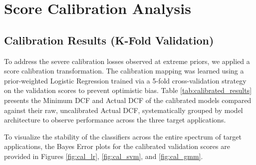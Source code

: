 \chapter{Score Calibration Analysis}
\label{chap:score_calibration}
\section{Calibration Results (K-Fold Validation)}
To address the severe calibration losses observed at extreme priors, we applied a score calibration transformation. The calibration mapping was learned using a prior-weighted Logistic Regression trained via a 5-fold cross-validation strategy on the validation scores to prevent optimistic bias.
Table \ref{tab:calibrated_results} presents the Minimum DCF and Actual DCF of the calibrated models compared against their raw, uncalibrated Actual DCF, systematically grouped by model architecture to observe performance across the three target applications.
\begin{table}[H]
\centering
\caption{Performance of Calibrated Models (K-Fold Validation) vs. Raw Actual DCF, grouped by Model.}
\label{tab:calibrated_results}
\end{table}
To visualize the stability of the classifiers across the entire spectrum of target applications, the Bayes Error plots for the calibrated validation scores are provided in Figures \ref{fig:cal_lr}, \ref{fig:cal_svm}, and \ref{fig:cal_gmm}.
